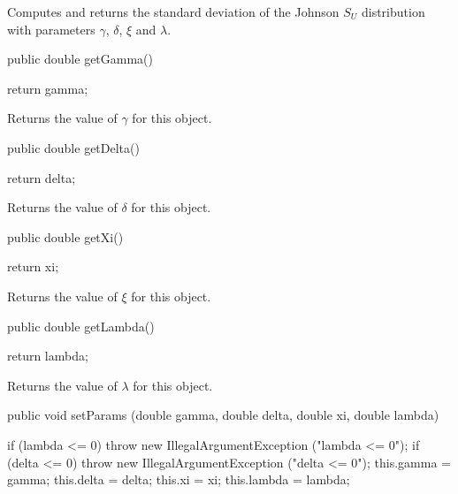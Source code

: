 \begin{tabb}  Computes and returns the standard deviation of the Johnson $S_U$
   distribution with parameters $\gamma$, $\delta$, $\xi$ and $\lambda$.
\end{tabb}
\begin{htmlonly}
\end{htmlonly}
\begin{code}      

   public double getGamma()\begin{hide} {
      return gamma;
   }\end{hide}
\end{code}
  \begin{tabb}
  Returns the value of $\gamma$ for this object.
 \end{tabb}
\begin{code}      

   public double getDelta()\begin{hide} {
      return delta;
   }\end{hide}
\end{code}
  \begin{tabb}
  Returns the value of $\delta$ for this object.
 \end{tabb}
\begin{code}      

   public double getXi()\begin{hide} {
      return xi;
   }\end{hide}
\end{code}
  \begin{tabb}
  Returns the value of $\xi$ for this object.
 \end{tabb}
\begin{code}      

   public double getLambda()\begin{hide} {
      return lambda;
   }
\end{hide}
\end{code}
  \begin{tabb}
  Returns the value of $\lambda$ for this object.
 \end{tabb}
\begin{code}      

   public void setParams (double gamma, double delta,
                          double xi, double lambda)\begin{hide} {
      if (lambda <= 0)
         throw new IllegalArgumentException ("lambda <= 0");
      if (delta <= 0)
         throw new IllegalArgumentException ("delta <= 0");
      this.gamma = gamma;
      this.delta = delta;
      this.xi = xi;
      this.lambda = lambda;
   }\end{hide}
\end{code}
